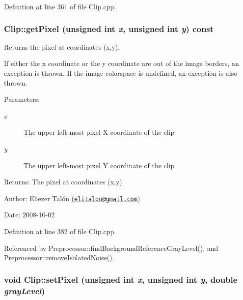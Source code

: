 Definition at line 361 of file Clip.cpp.\hypertarget{class_clip_74eded11c0dcbd2b10b453074cbb8b84}{
\subsubsection[getPixel]{ Clip::getPixel (unsigned int {\em x}, \/  unsigned int {\em y}) const}}
\label{class_clip_74eded11c0dcbd2b10b453074cbb8b84}


Returns the pixel at coordinates (x,y). 

If either the x coordinate or the y coordinate are out of the image borders, an exception is thrown. If the image colorspace is undefined, an exception is also thrown.

\begin{Desc}
\item[Parameters:]
\begin{description}
\item[{\em x}]The upper left-most pixel X coordinate of the clip \item[{\em y}]The upper left-most pixel Y coordinate of the clip\end{description}
\end{Desc}
\begin{Desc}
\item[Returns:]The pixel at coordinates (x,y)\end{Desc}
\begin{Desc}
\item[Author:]Eliezer Talón (\href{mailto:elitalon@gmail.com}{\tt elitalon@gmail.com}) \end{Desc}
\begin{Desc}
\item[Date:]2008-10-02 \end{Desc}


Definition at line 382 of file Clip.cpp.

Referenced by Preprocessor::findBackgroundReferenceGrayLevel(), and Preprocessor::removeIsolatedNoise().\hypertarget{class_clip_3c48493242de7453438ed0e8d0ea74df}{
\subsubsection[setPixel]{\setlength{\rightskip}{0pt plus 5cm}void Clip::setPixel (unsigned int {\em x}, \/  unsigned int {\em y}, \/  double {\em grayLevel})}}
\label{class_clip_3c48493242de7453438ed0e8d0ea74df}


